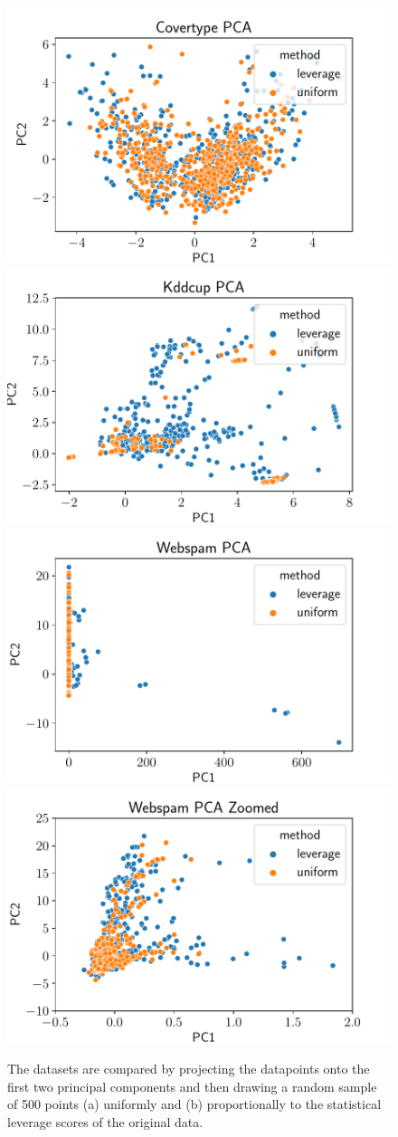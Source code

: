 \begin{figure}[ht!]
    \centering
    \includegraphics[width=.49\linewidth]{figures/covertype_pca.pdf}
    \includegraphics[width=.49\linewidth]{figures/kddcup_pca.pdf}
    \includegraphics[width=.49\linewidth]{figures/webspam_pca.pdf}
    \includegraphics[width=.49\linewidth]{figures/webspam_pca_zoomed.pdf}
    \caption{The datasets are compared by projecting the datapoints
        onto the first two principal components and then drawing
        a random sample of 500 points (a) uniformly and (b) proportionally to the
        statistical leverage scores of the original data.}
    \label{fig:dataset-comparison}
\end{figure}

